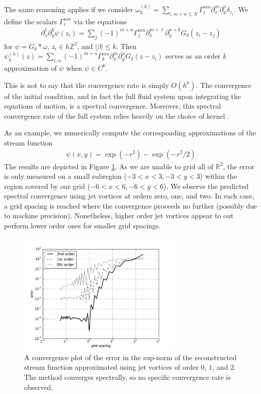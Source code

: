 \documentclass[12pt]{amsart}
\theoremstyle{remark}
\begin{document}
The same reasoning applies if we consider $\omega^{(k)}_h = \sum_{i,m+n \leq N} \Gamma_i^{mn} \partial_x^m \partial_y^n \delta_{z_i}$.
We define the scalars $\Gamma_i^{mn}$ via the equations
\begin{align*}
  \partial_x^\ell \partial_y^k \psi (z_i) = \sum_j (-1)^{m+n} \Gamma_j^{mn} \partial_x^{m+\ell} \partial_y^{n+k} G_\delta(z_i - z_j)
\end{align*}
for $\psi = G_\delta*\omega$, $z_i \in h \mathbb{Z}^2$, and $|\beta| \leq k$.
Then $\psi^{(k)}_h (z)= \sum_{i,\alpha} (-1)^{m+n} \Gamma_k^{mn} \partial_x^m \partial_y^n G_\delta( z - z_i)$
serves as an order $k$ approximation of $\psi$ when $\psi \in C^k$.

This is not to say that the convergence rate is simply $O(h^k)$.
The convergence of the initial condition, and in fact the full fluid system
upon integrating the equations of motion, is a spectral convergence.
Moreover, this spectral convergence rate of the full system relies heavily on the choice of kernel
\cite{BealeMajda1982}.

As an example, we numerically compute the corresponding approximations of the stream function
\begin{align}
        \psi(x,y) = \exp( - r^2 ) - \exp( - r^2 / 2 )
        \label{eq:psi_exact}
\end{align}
The results are depicted in Figure \ref{fig:convergence}.
As we are unable to grid all of $\mathbb{R}^2$, the error
is only measured on a small subregion ($-3<x<3, -3<y<3$) within the region covered by our grid
($-6<x<6, -6 < y < 6 $).
We observe the predicted spectral convergence using jet vortices at orders zero, one, and two.
In each case, a grid spacing is reached where the convergence proceeds no further (possibly 
due to machine precision).
Nonetheless, higher order jet vortices appear to out perform lower order ones for smaller grid spacings.
\begin{figure}[h]
        \centering
        \includegraphics[width=0.7\textwidth]{./images/convergence.pdf}
        \caption{A convergence plot of the error in the sup-norm
        of the reconstructed stream function approximated using jet vortices of order $0$, $1$, and $2$.
        The method converges spectrally, so no specific convergence rate is observed.}
        \label{fig:convergence}
\end{figure}
\end{document}
